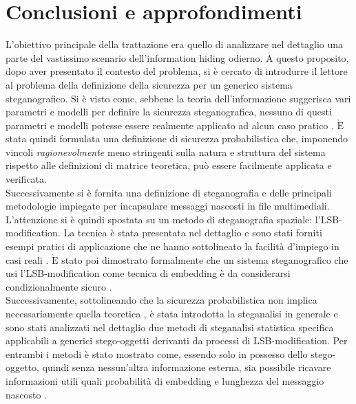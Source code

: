 \chapter{Conclusioni e approfondimenti}
L'obiettivo principale della trattazione era quello di analizzare nel dettaglio una parte del vastissimo scenario dell'information hiding odierno. A questo proposito, dopo aver presentato il contesto del problema, si è cercato di introdurre il lettore al problema della definizione della sicurezza per un generico sistema steganografico. Si è visto come, sebbene la teoria dell'informazione suggerisca vari parametri e modelli per definire la sicurezza steganografica, nessuno di questi parametri e modelli potesse essere realmente applicato ad alcun caso pratico \cite{sec, warfare}. $\mathrm{\grave{E}}$ stata quindi formulata una definizione di sicurezza probabilistica \cite{sec} che, imponendo vincoli \textit{ragionevolmente} meno stringenti sulla natura e struttura del sistema rispetto alle definizioni di matrice teoretica, può essere facilmente applicata e verificata.\\Successivamente si è fornita una definizione di steganografia e delle principali metodologie impiegate per incapsulare messaggi nascosti in file multimediali. L'attenzione si è quindi spostata su un metodo di steganografia spaziale: l'LSB-modification. La tecnica è stata presentata nel dettaglio e sono stati forniti esempi pratici di applicazione che ne hanno sottolineato la facilità d'impiego in casi reali \cite{survey, survey2, seeingTheUnseen, warfare}. $\mathrm{\grave{E}}$ stato poi dimostrato formalmente che un sistema steganografico che usi l'LSB-modification come tecnica di embedding è da considerarsi condizionalmente sicuro \cite{sec}.\\Successivamente, sottolineando che la sicurezza probabilistica non implica necessariamente quella teoretica \cite{sec}, è stata introdotta la steganalisi in generale e sono stati analizzati nel dettaglio due metodi di steganalisi statistica specifica applicabili a generici stego-oggetti derivanti da processi di LSB-modification.
Per entrambi i metodi è stato mostrato come, essendo solo in possesso dello stego-oggetto, quindi senza nessun'altra informazione esterna, sia possibile ricavare informazioni utili quali probabilità di embedding e lunghezza del messaggio nascosto \cite{fried1, fried2, chisq, survey, survey2}.
